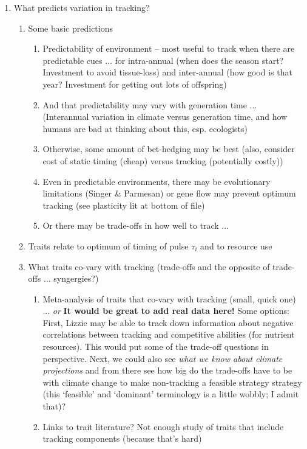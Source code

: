 \documentclass[11pt,letterpaper]{article}
\begin{document}
\begin{enumerate}
\item What predicts variation in tracking?
\begin{enumerate}
\item Some basic predictions
\begin{enumerate}
\item Predictability of environment -- most useful to track when there are predictable cues ... for intra-annual (when does the season start? Investment to avoid tissue-loss) and inter-annual (how good is that year? Investment for getting out lots of offspring) 
\item And that predictability may vary with generation time ... (Interannual variation in climate versus generation time, and how humans are bad at thinking about this, esp. ecologists) %
\item Otherwise, some amount of bet-hedging may be best (also, consider cost of static timing (cheap) versus tracking (potentially costly))
\item Even in predictable environments, there may be evolutionary limitations (Singer \& Parmesan) or gene flow may prevent optimum tracking (see plasticity lit at bottom of file)
\item Or there may be trade-offs in how well to track ... 
\end{enumerate}
\item Traits relate to optimum of timing of pulse $\tau_{i}$  and to resource use 
\item What traits co-vary with tracking (trade-offs and the opposite of trade-offs ... syngergies?)
\begin{enumerate}
\item Meta-analysis of traits that co-vary with tracking (small, quick one) ... \emph{or} {\bf It would be great to add real data here!} Some options: First, Lizzie may be able to track down information about negative correlations between tracking and competitive abilities (for nutrient resources). This would put some of the trade-off questions in perspective. Next, we could also see  \emph{what we know about climate projections} and from there see how big do the trade-offs have to be with climate change to make non-tracking a feasible strategy strategy (this `feasible' and `dominant' terminology is a little wobbly; I admit that)? %
\item Links to trait literature? Not enough study of traits that include tracking components (because that's hard)
\begin{enumerate}

\end{enumerate}
\end{enumerate}
\end{enumerate}
\end{enumerate}
\end{document}
